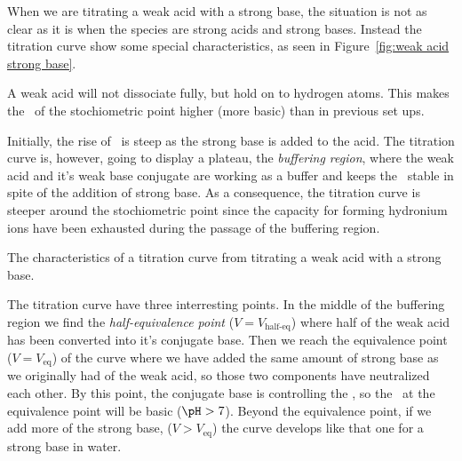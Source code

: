 \documentclass[../mit-general-chemistry.tex]{subfiles}
\begin{document}
When we are titrating a weak acid with a strong base, the situation is
not as clear as it is when the species are strong acids and strong
bases. Instead the titration curve show some special characteristics,
as seen in Figure~\ref{fig:weak acid strong base}.

A weak acid will not dissociate fully, but hold on to hydrogen
atoms. This makes the \pH\ of the stochiometric point higher (more
basic) than in previous set ups.

Initially, the rise of \pH\ is steep as the strong base is added to
the acid.  The titration curve is, however, going to display a
plateau, the {\em buffering region}, where the weak acid and it's weak
base conjugate are working as a buffer and keeps the \pH\ stable in
spite of the addition of strong base. As a consequence, the titration
curve is steeper around the stochiometric point since the capacity for
forming hydronium ions have been exhausted during the passage of the
buffering region.



\begin{marginfigure}
  \begin{center}
  \end{center}
  \caption{The characteristics of a titration curve from titrating a
    weak acid with a strong base.\label{fig:weak acid strong base}}
\end{marginfigure}




The titration curve have three interresting points. In the middle of
the buffering region we find the {\em half-equivalence point} ($V =
V_{\text{half-eq}}$) where half of the weak acid has been converted
into it's conjugate base. Then we reach the equivalence point ($V =
V_{\text{eq}}$) of the curve where we have added the same amount of
strong base as we originally had of the weak acid, so those two
components have neutralized each other. By this point, the conjugate
base is controlling the \pH, so the \pH\ at the equivalence point will
be basic ($\pH > 7$). Beyond the equivalence point, if we add more of
the strong base, ($V > V_{\text{eq}}$) the curve develops like that
one for a strong base in water.
\end{document}
